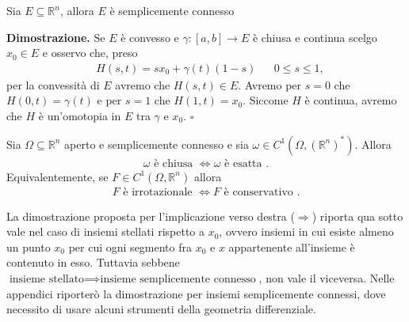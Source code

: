 \vspace{0.5cm}
\begin{prop}[\textcolor{blue}{gli insiemi convessi sono semplicemente connessi}]
	Sia $E \subseteq \mathbb{R}^n$, allora $E$ è semplicemente connesso
\end{prop}

\noindent \textbf{Dimostrazione. }
Se $E$ è convesso e $\gamma: [a, b] \to E$ è chiusa e continua scelgo $x_0 \in E$ e osservo che, preso
	\begin{align*}
	&H(s,t) = sx_0 + \gamma(t) (1 - s) & &0 \leq s \leq 1,
	\end{align*}
	per la convessità di $E$ avremo che $H(s, t) \in E$. Avremo per $s = 0$ che $H(0, t)=\gamma(t)$ e per $s=1$ che $H(1, t)=x_0$. Siccome $H$ è continua, avremo che $H$ è un'omotopia in $E$ tra $\gamma$ e $x_0$.
\hfill $\square$

\vspace{0.5cm}
\begin{theorem}[\textcolor{blue}{lemma di Poincare per gli aperti semplicemente connesi}]
	Sia $\Omega \subseteq \mathbb{R}^n$ aperto e semplicemente connesso e sia $\omega \in C^1(\Omega, (\mathbb{R}^n)^*)$. Allora
	\begin{align*}
		\omega \text{ è chiusa } \iff \omega \text{ è esatta }. 
	\end{align*}
	Equivalentemente, se $F \in C^1(\Omega, \mathbb{R}^n)$ allora
	\begin{align*}
		F \text{ è irrotazionale } \iff F \text{ è conservativo }.
	\end{align*}
\end{theorem}
La dimostrazione proposta per l'implicazione verso destra ($\Rightarrow$) riporta qua sotto vale nel caso di insiemi stellati rispetto a $x_0$, ovvero insiemi in cui esiste almeno un punto $x_0$ per cui ogni segmento fra $x_0$ e $x$ appartenente all'insieme è contenuto in esso. Tuttavia sebbene $\text{insieme stellato} \implies \text{insieme semplicemente connesso}$, non vale il viceversa.
Nelle appendici riporterò la dimostrazione per insiemi semplicemente connessi, dove necessito di usare alcuni strumenti della geometria differenziale.

